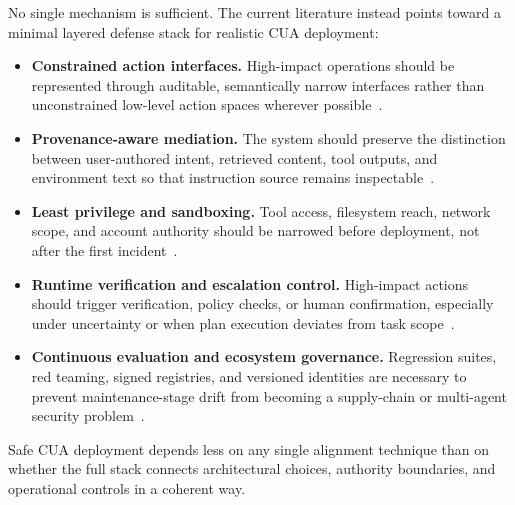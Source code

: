 No single mechanism is sufficient. The current literature instead points toward a minimal layered defense stack for realistic CUA deployment:
\begin{itemize}
  \item \textbf{Constrained action interfaces.} High-impact operations should be represented through auditable, semantically narrow interfaces rather than unconstrained low-level action spaces wherever possible~\cite{jones2025systematization,miculicich2025veriguard}.
  \item \textbf{Provenance-aware mediation.} The system should preserve the distinction between user-authored intent, retrieved content, tool outputs, and environment text so that instruction source remains inspectable~\cite{kang2025mitigating,zhang2025browsesafe}.
  \item \textbf{Least privilege and sandboxing.} Tool access, filesystem reach, network scope, and account authority should be narrowed before deployment, not after the first incident~\cite{gong2025secure,meng2025cellmate,foerster2026camels}.
  \item \textbf{Runtime verification and escalation control.} High-impact actions should trigger verification, policy checks, or human confirmation, especially under uncertainty or when plan execution deviates from task scope~\cite{ning2026actions,zhang2026mirrorguard,liu2026clawkeeper}.
  \item \textbf{Continuous evaluation and ecosystem governance.} Regression suites, red teaming, signed registries, and versioned identities are necessary to prevent maintenance-stage drift from becoming a supply-chain or multi-agent security problem~\cite{liao2025redteamcua,zheng2026riskybench,zhang2025mcp,wang2026asset}.
\end{itemize}

Safe CUA deployment depends less on any single alignment technique than on whether the full stack connects architectural choices, authority boundaries, and operational controls in a coherent way.
